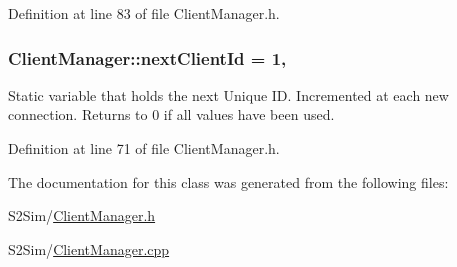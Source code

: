 Definition at line 83 of file Client\-Manager.\-h.

\hypertarget{class_client_manager_a4f044df4d9f43367135f9d01841ec326}{
\subsubsection[{next\-Client\-Id}]{ Client\-Manager\-::next\-Client\-Id = 1\hspace{0.3cm}{\ttfamily [static]}, {\ttfamily [private]}}}\label{class_client_manager_a4f044df4d9f43367135f9d01841ec326}
Static variable that holds the next Unique I\-D. Incremented at each new connection. Returns to 0 if all values have been used. 

Definition at line 71 of file Client\-Manager.\-h.



The documentation for this class was generated from the following files\-:\begin{DoxyCompactItemize}
\item 
S2\-Sim/\hyperlink{_client_manager_8h}{Client\-Manager.\-h}\item 
S2\-Sim/\hyperlink{_client_manager_8cpp}{Client\-Manager.\-cpp}\end{DoxyCompactItemize}
